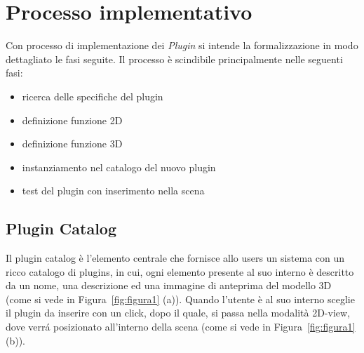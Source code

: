\section{Processo implementativo}
\label{sec:chapter_3_section_5}

Con processo di implementazione dei \emph{Plugin} si intende la formalizzazione in modo dettagliato le fasi seguite.
Il processo è scindibile principalmente nelle seguenti fasi:
\begin{itemize}
  \item ricerca delle specifiche del plugin
  \item definizione funzione 2D
  \item definizione funzione 3D
  \item instanziamento nel catalogo del nuovo plugin
  \item test del plugin con inserimento nella scena
\end{itemize}

\subsection*{Plugin Catalog}
\label{sec:chapter_3_section_5_sub_1}

\noindent
 Il plugin catalog \`e l'elemento centrale che fornisce allo users un sistema con un ricco catalogo di plugins,
 in cui, ogni elemento presente al suo interno \`e descritto da un nome, una descrizione ed una
 immagine di anteprima del modello 3D (come si vede in Figura~\ref{fig:figura1} (a)). Quando l'utente \`e al suo interno
 sceglie il plugin da inserire con un click, dopo il quale, si passa nella modalit\`a 2D-view, dove verr\'a posizionato
 all'interno della scena (come si vede in Figura~\ref{fig:figura1} (b)).


